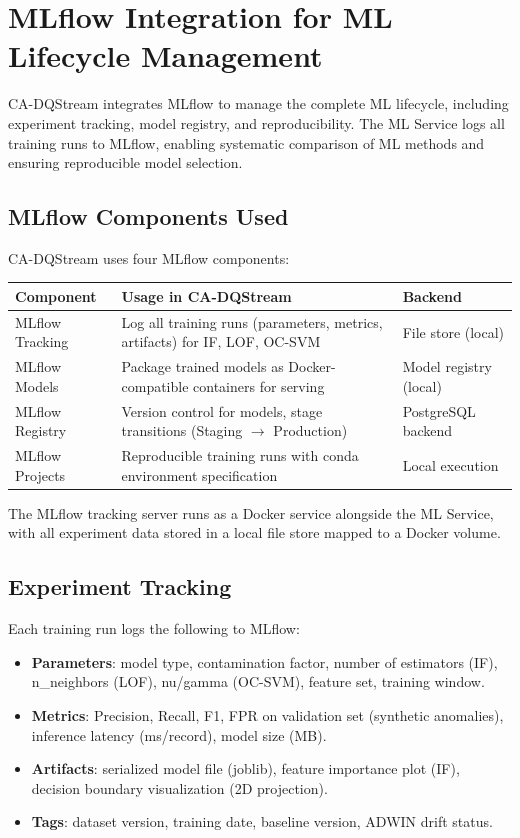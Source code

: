 \section{MLflow Integration for ML Lifecycle Management}

CA-DQStream integrates MLflow to manage the complete ML lifecycle, including experiment tracking, model registry, and reproducibility. The ML Service logs all training runs to MLflow, enabling systematic comparison of ML methods and ensuring reproducible model selection.

\subsection{MLflow Components Used}

CA-DQStream uses four MLflow components:

\begin{longtable}{|m{3.5cm}|m{6cm}|m{5cm}|}
\hline
\textbf{Component} & \textbf{Usage in CA-DQStream} & \textbf{Backend} \\ \hline
MLflow Tracking & Log all training runs (parameters, metrics, artifacts) for IF, LOF, OC-SVM & File store (local) \\ \hline
MLflow Models & Package trained models as Docker-compatible containers for serving & Model registry (local) \\ \hline
MLflow Registry & Version control for models, stage transitions (Staging $\to$ Production) & PostgreSQL backend \\ \hline
MLflow Projects & Reproducible training runs with conda environment specification & Local execution \\ \hline
\end{longtable}

The MLflow tracking server runs as a Docker service alongside the ML Service, with all experiment data stored in a local file store mapped to a Docker volume.

\subsection{Experiment Tracking}

Each training run logs the following to MLflow:

\begin{itemize}
    \item \textbf{Parameters}: model type, contamination factor, number of estimators (IF), n\_neighbors (LOF), nu/gamma (OC-SVM), feature set, training window.
    \item \textbf{Metrics}: Precision, Recall, F1, FPR on validation set (synthetic anomalies), inference latency (ms/record), model size (MB).
    \item \textbf{Artifacts}: serialized model file (joblib), feature importance plot (IF), decision boundary visualization (2D projection).
    \item \textbf{Tags}: dataset version, training date, baseline version, ADWIN drift status.
\end{itemize}

